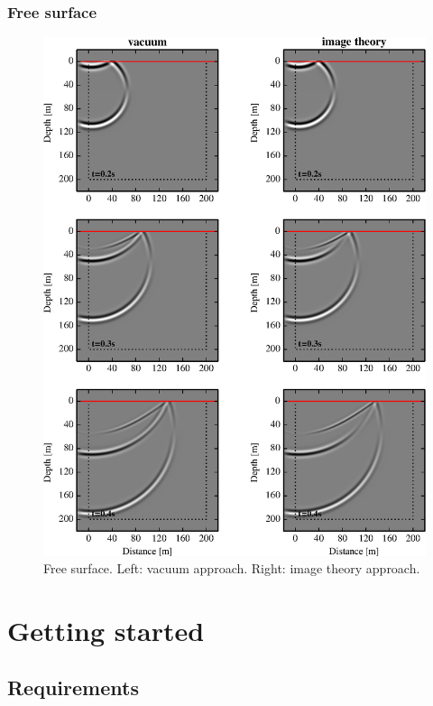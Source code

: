 \documentclass{gnulike}
\begin{document}
\subsection{Free surface}

\begin{figure}[!ht]
  \centering
  \includegraphics[scale=1.0]{fig/validation_fsurf.eps}
  \caption{Free surface. Left: vacuum approach. Right: image theory approach.}
\end{figure}

\chapter{Getting started}

\section{Requirements}
\end{document}
